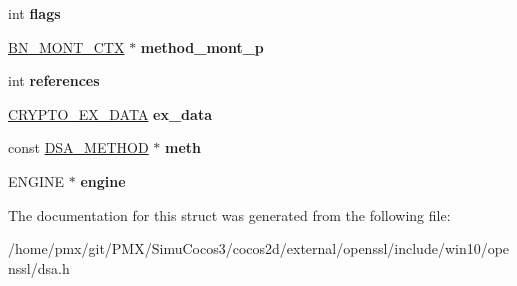 \begin{DoxyCompactItemize}
int {\bfseries flags}
\item 
\mbox{\label{structdsa__st_aea9e4de390af7d5bc289a203824ffb5f}} 
\hyperlink{structbn__mont__ctx__st}{B\+N\+\_\+\+M\+O\+N\+T\+\_\+\+C\+TX} $\ast$ {\bfseries method\+\_\+mont\+\_\+p}
\item 
\mbox{\label{structdsa__st_a4a1337f8a116a7f1b322639edfa9d580}} 
int {\bfseries references}
\item 
\mbox{\label{structdsa__st_a0def4851606ac230c65f4409de2c0c71}} 
\hyperlink{structcrypto__ex__data__st}{C\+R\+Y\+P\+T\+O\+\_\+\+E\+X\+\_\+\+D\+A\+TA} {\bfseries ex\+\_\+data}
\item 
\mbox{\label{structdsa__st_af5e872d3d77bbba895b6b917f1a71d3a}} 
const \hyperlink{structdsa__method}{D\+S\+A\+\_\+\+M\+E\+T\+H\+OD} $\ast$ {\bfseries meth}
\item 
\mbox{\label{structdsa__st_a0cfa8000f47729c5eb6cc2053eb01b75}} 
E\+N\+G\+I\+NE $\ast$ {\bfseries engine}
\end{DoxyCompactItemize}


The documentation for this struct was generated from the following file\+:\begin{DoxyCompactItemize}
\item 
/home/pmx/git/\+P\+M\+X/\+Simu\+Cocos3/cocos2d/external/openssl/include/win10/openssl/dsa.\+h\end{DoxyCompactItemize}
